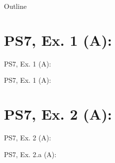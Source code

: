 

\maketitle

  \newcommand{\intuition}[1]{#1} %


\begin{frame}{Outline}
    \tableofcontents
\end{frame}



\section{PS7, Ex. 1 (A): }

\begin{frame}{PS7, Ex. 1 (A): }
  \begin{multicols}{2}
    \vfill\null\columnbreak
    \vfill
  \end{multicols}
\end{frame}

\begin{frame}{PS7, Ex. 1 (A): }
  \begin{multicols}{2}
    \vfill\null\columnbreak
    \vfill
  \end{multicols}
\end{frame}



\section{PS7, Ex. 2 (A): }

\begin{frame}{PS7, Ex. 2 (A): }
  \begin{multicols}{2}
    \vfill\null\columnbreak
    \vfill
  \end{multicols}
\end{frame}

\begin{frame}{PS7, Ex. 2.a (A): }
  \begin{multicols}{2}
    \vfill\null\columnbreak
    \vfill
  \end{multicols}
\end{frame}



